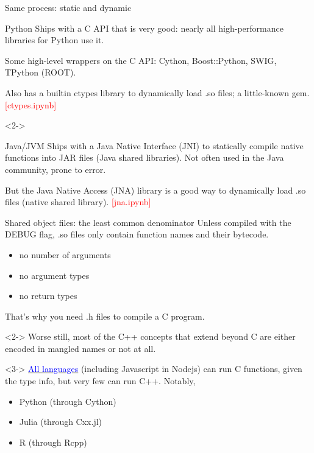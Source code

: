 \documentclass{beamer}
\begin{document}
\begin{frame}{Same process: static and dynamic}
\vspace{0.25 cm}
\begin{block}{Python}
Ships with a C API that is very good: nearly all high-performance libraries for Python use it.

\vspace{0.25 cm}
Some high-level wrappers on the C API: Cython, Boost::Python, SWIG, TPython (ROOT).

\vspace{0.25 cm}
Also has a builtin ctypes library to dynamically load .so files; a little-known gem. \hfill \textcolor{red}{[ctypes.ipynb]}
\end{block}

\begin{uncoverenv}<2->
\begin{block}{Java/JVM}
Ships with a Java Native Interface (JNI) to statically compile native functions into JAR files (Java shared libraries). Not often used in the Java community, prone to error.

\vspace{0.25 cm}
But the Java Native Access (JNA) library is a good way to dynamically load .so files (native shared library). \hfill \textcolor{red}{[jna.ipynb]}
\end{block}\end{uncoverenv}
\end{frame}

\begin{frame}{Shared object files: the least common denominator}
\vspace{0.5 cm}
Unless compiled with the DEBUG flag, .so files only contain function names and their bytecode.
\begin{itemize}
\item no number of arguments
\item no argument types
\item no return types
\end{itemize}
That's why you need .h files to compile a C program. \hspace{0.25 cm}{\tt :)}

\vspace{0.25 cm}
\begin{uncoverenv}<2->
Worse still, most of the C++ concepts that extend beyond C are either encoded in mangled names or not at all.
\end{uncoverenv}

\vspace{0.25 cm}
\begin{uncoverenv}<3->
\href{https://rosettacode.org/wiki/Call_a_foreign-language_function}{\textcolor{blue}{All languages}} (including Javascript in Nodejs) can run C functions, given the type info, but very few can run C++. Notably,
\begin{itemize}
\item Python (through Cython)
\item Julia (through Cxx.jl)
\item R (through Rcpp)
\end{itemize}
\end{uncoverenv}
\end{frame}
\end{document}
